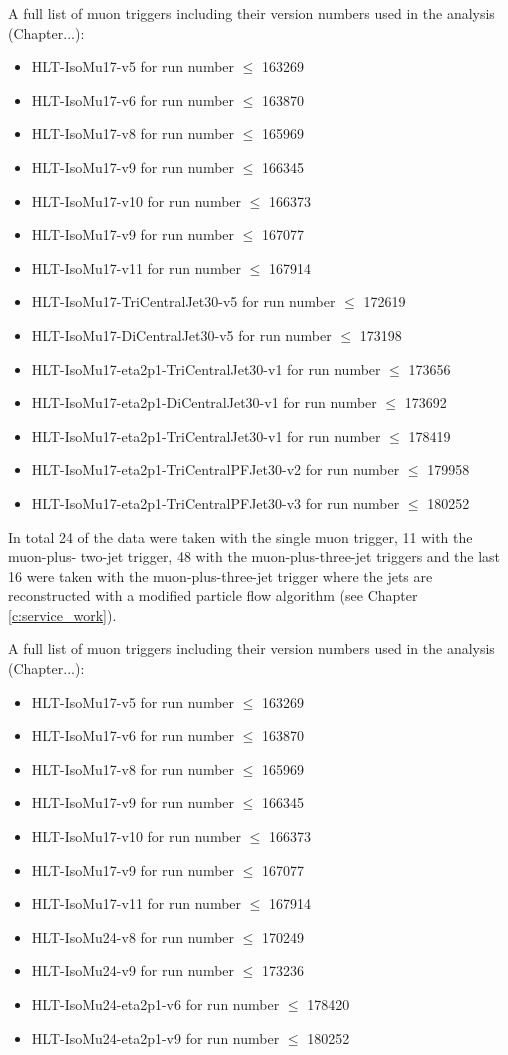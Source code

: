 A full list of muon triggers including their version numbers used in the \met analysis (Chapter...):
\begin{itemize}
	\item HLT-IsoMu17-v5 for run number $\leq$ 163269
	\item HLT-IsoMu17-v6 for run number $\leq$ 163870
	\item HLT-IsoMu17-v8 for run number $\leq$ 165969
	\item HLT-IsoMu17-v9 for run number $\leq$ 166345
	\item HLT-IsoMu17-v10 for run number $\leq$ 166373
	\item HLT-IsoMu17-v9 for run number $\leq$ 167077
	\item HLT-IsoMu17-v11 for run number $\leq$ 167914
	\item HLT-IsoMu17-TriCentralJet30-v5 for run number $\leq$ 172619
	\item HLT-IsoMu17-DiCentralJet30-v5 for run number $\leq$ 173198
	\item HLT-IsoMu17-eta2p1-TriCentralJet30-v1 for run number $\leq$ 173656
	\item HLT-IsoMu17-eta2p1-DiCentralJet30-v1 for run number $\leq$ 173692
	\item HLT-IsoMu17-eta2p1-TriCentralJet30-v1 for run number $\leq$ 178419
	\item HLT-IsoMu17-eta2p1-TriCentralPFJet30-v2 for run number $\leq$ 179958
	\item HLT-IsoMu17-eta2p1-TriCentralPFJet30-v3 for run number $\leq$ 180252
\end{itemize}

In total \SI{24}{\pc} of the data were taken with the single muon trigger,
\SI{11}{\pc} with the muon-plus- two-jet trigger, \SI{48}{\pc} with the
muon-plus-three-jet triggers and the last \SI{16}{\pc} were taken with the
muon-plus-three-jet trigger where the jets are reconstructed with a modified
particle flow algorithm (see Chapter \ref{c:service_work}).

A full list of muon triggers including their version numbers used in the \met analysis (Chapter...):
\begin{itemize}
	\item HLT-IsoMu17-v5 for run number $\leq$ 163269
	\item HLT-IsoMu17-v6 for run number $\leq$ 163870
	\item HLT-IsoMu17-v8 for run number $\leq$ 165969
	\item HLT-IsoMu17-v9 for run number $\leq$ 166345
	\item HLT-IsoMu17-v10 for run number $\leq$ 166373
	\item HLT-IsoMu17-v9 for run number $\leq$ 167077 %
	\item HLT-IsoMu17-v11 for run number $\leq$ 167914
	\item HLT-IsoMu24-v8 for run number $\leq$ 170249
	\item HLT-IsoMu24-v9 for run number $\leq$ 173236
	\item HLT-IsoMu24-eta2p1-v6 for run number $\leq$ 178420
	\item HLT-IsoMu24-eta2p1-v9 for run number $\leq$ 180252
\end{itemize}



